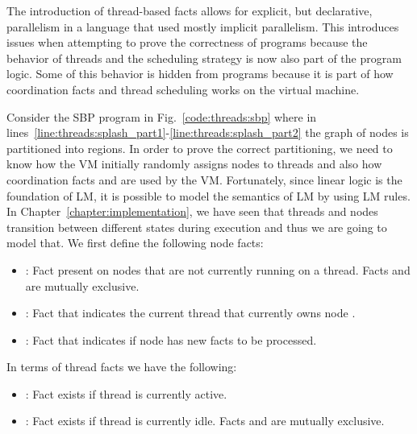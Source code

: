 The introduction of thread-based facts allows for explicit, but declarative,
parallelism in a language that used mostly implicit parallelism. This
introduces issues when attempting to prove the correctness of programs because
the behavior of threads and the scheduling strategy is now also part of the
program logic.  Some of this behavior is hidden from programs because it is part
of how coordination facts and thread scheduling works on the virtual machine.

Consider the SBP program in Fig.~\ref{code:threads:sbp} where in
lines~\ref{line:threads:splash_part1}-\ref{line:threads:splash_part2} the graph
of nodes is partitioned into regions. In order to prove the correct
partitioning, we need to know how the VM initially randomly assigns nodes to
threads and also how coordination facts  and 
are used by the VM.  Fortunately, since linear logic is the foundation of LM, it
is possible to model the semantics of LM by using LM rules. In
Chapter~\ref{chapter:implementation}, we have seen that threads and nodes
transition between different states during execution and thus we are going to
model that. We first define the following node facts:

\begin{itemize}

   \item {}: Fact present on nodes that are not currently
      running on a thread. Facts  and  are
      mutually exclusive.

   \item {}: Fact that indicates the current thread
       that currently owns node .

   \item {}: Fact that indicates if node
       has new facts to be processed.

\end{itemize}

In terms of thread facts we have the following:

\begin{itemize}
   \item {}: Fact exists if thread  is currently
      active.

   \item {}: Fact exists if thread  is currently
      idle. Facts  and  are mutually exclusive.
\end{itemize}


